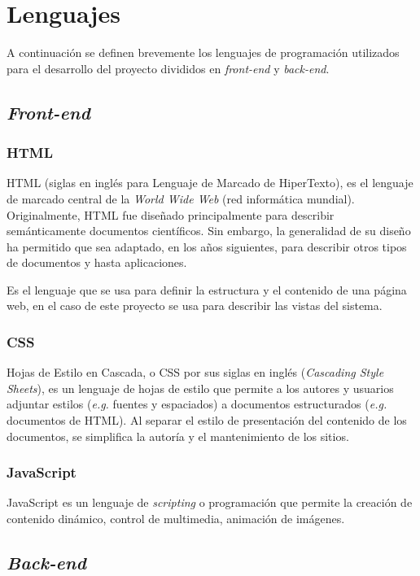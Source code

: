 \section{Lenguajes}
A continuación se definen brevemente los lenguajes de programación utilizados para el desarrollo del proyecto divididos en \textit{front-end} y \textit{back-end}.

\subsection{\emph{Front-end}}
\subsubsection{HTML}
HTML \cite{htmlW3C} (siglas en inglés para Lenguaje de Marcado de HiperTexto), es el lenguaje de marcado central de la \textit{World Wide Web} (red informática mundial). Originalmente, HTML fue diseñado principalmente para describir semánticamente documentos científicos. Sin embargo, la generalidad de su diseño ha permitido que sea adaptado, en los años siguientes, para describir otros tipos de documentos y hasta aplicaciones.

Es el lenguaje que se usa para definir la estructura y el contenido de una página web, en el caso de este proyecto se usa para describir las vistas del sistema.

\subsubsection{CSS}
Hojas de Estilo en Cascada, o CSS \cite{cssW3C} por sus siglas en inglés (\textit{Cascading Style Sheets}), es un lenguaje de hojas de estilo que permite a los autores y usuarios adjuntar estilos (\textit{e.g.} fuentes y espaciados) a documentos estructurados (\textit{e.g.} documentos de HTML). Al separar el estilo de presentación del contenido de los documentos, se simplifica la autoría y el mantenimiento de los sitios.

\subsubsection{JavaScript}
JavaScript \cite{jsMozilla} es un lenguaje de \textit{scripting} o programación que permite la creación de contenido dinámico, control de multimedia, animación de imágenes.

\subsection{\emph{Back-end}}
